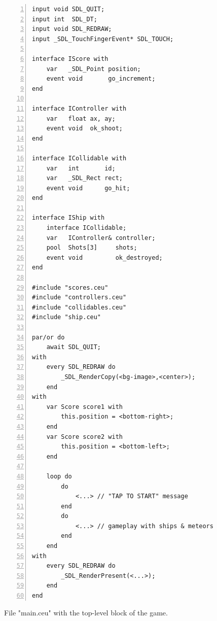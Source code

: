 \documentclass{sigplanconf}
\newcommand{\1}{\;}
\newcommand{\2}{\;\;}
\newcommand{\3}{\;\;\;}
\newcommand{\5}{\;\;\;\;\;}
\begin{document}
\begin{figure}[t]
\begin{lstlisting}[numbers=left,xleftmargin=3em]
input void SDL_QUIT;
input int  SDL_DT;
input void SDL_REDRAW;
input _SDL_TouchFingerEvent* SDL_TOUCH;

interface IScore with
    var   _SDL_Point position;
    event void       go_increment;
end

interface IController with
    var   float ax, ay;
    event void  ok_shoot;
end

interface ICollidable with
    var   int       id;
    var   _SDL_Rect rect;
    event void      go_hit;
end

interface IShip with
    interface ICollidable;
    var   IController& controller;
    pool  Shots[3]     shots;
    event void         ok_destroyed;
end

#include "scores.ceu"
#include "controllers.ceu"
#include "collidables.ceu"
#include "ship.ceu"

par/or do
    await SDL_QUIT;
with
    every SDL_REDRAW do
        _SDL_RenderCopy(<bg-image>,<center>);
    end
with
    var Score score1 with
        this.position = <bottom-right>;
    end
    var Score score2 with
        this.position = <bottom-left>;
    end

    loop do
        do
            <...> // "TAP TO START" message
        end
        do
            <...> // gameplay with ships & meteors
        end
    end
with
    every SDL_REDRAW do
        _SDL_RenderPresent(<...>);
    end
end
\end{lstlisting}
\caption{ File "main.ceu" with the top-level block of the game.
\label{lst.apps.rocks.1}
}
\end{figure}
\end{document}
